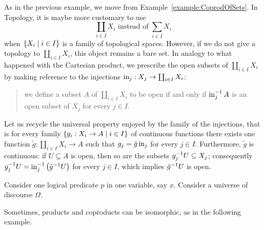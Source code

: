 \begin{example}
  As in the previous example, we move from
  Example~\ref{example:CoprodOfSets}. In Topology, it is maybe more
  customary to use
  \[\coprod_{i \in I} X_i \text{ instead of } \sum_{i \in I} X_i\]
  when \(\left\{X_i \mid i \in I\right\}\) is a family of topological
  spaces. However, if we do not give a topology to
  \(\coprod_{i \in I} X_i\), this object remains a bare set. In analogy to
  what happened with the Cartesian product, we prescribe the open
  subsets of \(\coprod_{i \in I} X_i\) by making reference to the injections
  \(\operatorname{in}_j : X_j \to \coprod_{i \in I} X_i\):
  \begin{quotation}
    we define a subset \(A\) of \(\coprod_{i \in I} X_i\) to be open if and
    only if \(\operatorname{in}_j^{-1} A\) is an open subset of \(X_j\) for every
    \(j \in I\).
  \end{quotation}
  Let us recycle the universal property enjoyed by the family of the
  injections, that is for every family
  \(\left\{g_i : X_i \to A \mid i \in I\right\}\) of continuous functions there exists
  one function \(\tilde g : \coprod_{i \in I} X_i \to A\) such that
  \(g_j = \tilde g \operatorname{in}_j\) for every \(j \in I\). Furthermore,
  \(\tilde g\) is continuous: if \(U \subseteq A\) is open, then so are the
  subsets \(g_j^{-1} U \subseteq X_j\); consequently
  \(g_j^{-1} U = \operatorname{in}_j^{-1} \left(\tilde g^{-1} U\right)\) for
  every \(j \in I\), which implies \(\tilde g^{-1} U\) is open.
\end{example}

\begin{example}
  Consider one logical predicate \(p\) in one variable, say
  \(x\). Consider a universe of discourse \(\Omega\). \YetToBeTeXed{}
\end{example}

Sometimes, products and coproducts can be isomorphic, as in the
following example.

\begin{example}
\end{example}

